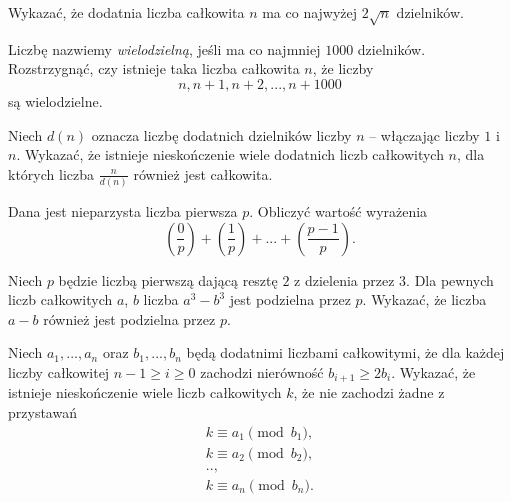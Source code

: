 \begin{problem}{1}
	Wykazać, że dodatnia liczba całkowita $n$ ma co najwyżej $2\sqrt{n}$ dzielników.
\end{problem}

\begin{problem}{2}
	Liczbę nazwiemy \textit{wielodzielną}, jeśli ma co najmniej $1000$ dzielników. Rozstrzygnąć, czy istnieje taka liczba całkowita $n$, że liczby
	\[
		n, n + 1, n + 2, ..., n + 1000
	\]
	są wielodzielne.
\end{problem}

\begin{problem}{3}
	Niech $d(n)$ oznacza liczbę dodatnich dzielników liczby $n$ -- włączając liczby $1$ i $n$. Wykazać, że istnieje nieskończenie wiele dodatnich liczb całkowitych $n$, dla których liczba $\frac{n}{d(n)}$ również jest całkowita.
\end{problem}

\begin{problem}{4}
	Dana jest nieparzysta liczba pierwsza $p$. Obliczyć wartość wyrażenia
	\[
		\left(\frac{0}{p}\right) + 
		\left(\frac{1}{p}\right) + 
		... +
		\left(\frac{p - 1}{p}\right).
	\]
\end{problem}

\begin{problem}{5}
	Niech $p$ będzie liczbą pierwszą dającą resztę $2$ z dzielenia przez $3$. Dla pewnych liczb całkowitych $a$, $b$ liczba $a^3 - b^3$ jest podzielna przez $p$. Wykazać, że liczba $a - b$ również jest podzielna przez $p$.
\end{problem}


\begin{problem}{6}
	Niech $a_1, ..., a_n$ oraz $b_1, ..., b_n$ będą dodatnimi liczbami całkowitymi, że dla każdej liczby całkowitej $n - 1\geqslant i \geqslant 0$ zachodzi nierówność $b_{i + 1} \geqslant 2b_{i}$. Wykazać, że istnieje nieskończenie wiele liczb całkowitych $k$, że nie zachodzi żadne z przystawań
	\begin{gather*}
		k \equiv a_1 \pmod{b_1}, \\
		k \equiv a_2 \pmod{b_2}, \\
		.., \\
		k \equiv a_n \pmod{b_n}.
	\end{gather*}
\end{problem}

